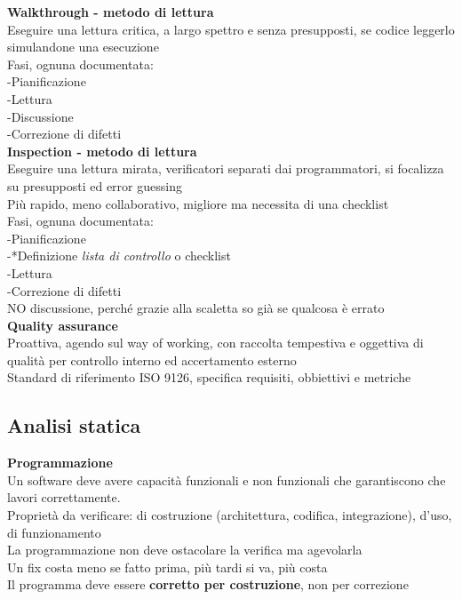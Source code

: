 \documentclass{article}
\begin{document}
				\textbf{Walkthrough - metodo di lettura}\\
				Eseguire una lettura critica, a largo spettro e senza presupposti, se codice leggerlo simulandone una esecuzione\\
				Fasi, ognuna documentata:\\
				-Pianificazione\\
				-Lettura\\
				-Discussione\\
				-Correzione di difetti\\
				
				\textbf{Inspection - metodo di lettura}\\
				Eseguire una lettura mirata, verificatori separati dai programmatori, si focalizza su presupposti ed error guessing\\
				Più rapido, meno collaborativo, migliore ma necessita di una checklist\\
				Fasi, ognuna documentata:\\
				-Pianificazione\\
				-*Definizione \textit{lista di controllo} o checklist\\
				-Lettura\\
				-Correzione di difetti\\
				NO discussione, perché grazie alla scaletta so già se qualcosa è errato\\
				
				\textbf{Quality assurance}\\
				Proattiva, agendo sul way of working, con raccolta tempestiva e oggettiva di qualità per controllo interno ed accertamento esterno\\
				Standard di riferimento ISO 9126, specifica requisiti, obbiettivi e metriche\\
				
			\subsection{Analisi statica}
				\textbf{Programmazione}\\
				Un software deve avere capacità funzionali e non funzionali che garantiscono che lavori correttamente.\\
				Proprietà da verificare: di costruzione (architettura, codifica, integrazione), d'uso, di funzionamento\\
				La programmazione non deve ostacolare la verifica ma agevolarla\\
				Un fix costa meno se fatto prima, più tardi si va, più costa\\
				Il programma deve essere \textbf{corretto per costruzione}, non per correzione\\
				
\end{document}
